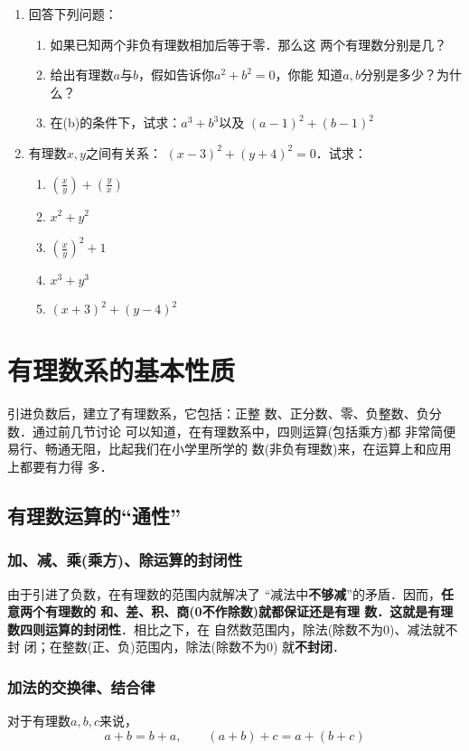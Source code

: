 \begin{enumerate}
	\item  回答下列问题：
	\begin{enumerate}
		\item 如果已知两个非负有理数相加后等于零．那么这
		两个有理数分别是几？
		\item 给出有理数$a$与$b$，假如告诉你$a^2 +b^2=0$，你能
		知道$a, b$分别是多少？为什么？
		\item 在(b)的条件下，试求：$a^3+b^3$以及
		$(a-1)^2+(b-1)^2$
	\end{enumerate}
	
	
	\item  有理数$x,  y$之间有关系：
	$(x-3)^2+(y+4)^2=0$．试求：
	\begin{multicols}{2}
		\begin{enumerate}
			\item $\left(\frac{x}{y}\right)+\left(\frac{y}{x}\right)$
			\item $x^2+y^2$
			\item $\left(\frac{x}{y}\right)^2+1$
			\item $x^3+y^3$
			\item $(x+3)^2+(y-4)^2$
		\end{enumerate}
	\end{multicols}
\end{enumerate}

\section{有理数系的基本性质}
引进负数后，建立了有理数系，它包括：正整
数、正分数、零、负整数、负分数．通过前几节讨论
可以知道，在有理数系中，四则运算(包括乘方)都
非常简便易行、畅通无阻，比起我们在小学里所学的
数(非负有理数)来，在运算上和应用上都要有力得
多．

\subsection{有理数运算的“通性”}
\subsubsection{加、减、乘(乘方)、除运算的封闭性}
由于引进了负数，在有理数的范围内就解决了
“减法中\textbf{不够减}”的矛盾．因而，\textbf{任意两个有理数的
	和、差、积、商(0不作除数)就都保证还是有理
	数．这就是有理数四则运算的封闭性}．相比之下，在
自然数范围内，除法(除数不为0)、减法就不封
闭；在整数(正、负)范围内，除法(除数不为0)
就\textbf{不封闭}．

\subsubsection{加法的交换律、结合律}
\begin{blk}{}
	对于有理数$a,b,c$来说，
	\[a+b=b+a,\qquad (a+b)+c=a+(b+c)\]
\end{blk}

